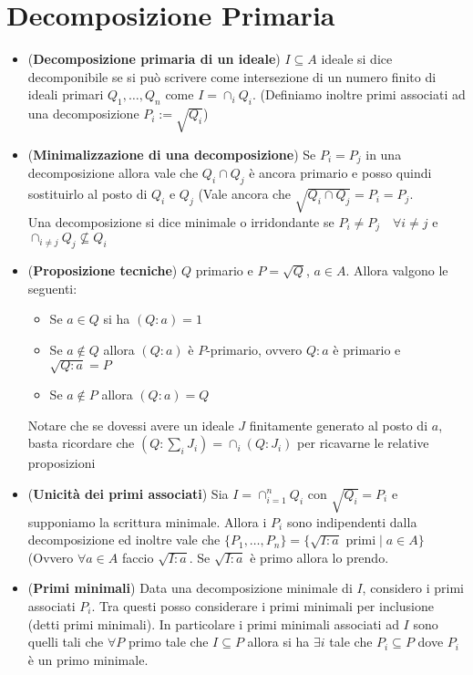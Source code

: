 \documentclass[a4paper,NoNotes,GeneralMath]{stdmdoc}
\begin{document}
	\section*{Decomposizione Primaria}
	\begin{itemize}
		\item ({\bf Decomposizione primaria di un ideale}) $I \subseteq A$ ideale si dice decomponibile se si può scrivere come intersezione di un numero finito di ideali primari $Q_1, \ldots, Q_n$ come $I = \cap_i Q_i$. (Definiamo inoltre primi associati ad una decomposizione $P_i := \sqrt{Q_i}$)
		\item ({\bf Minimalizzazione di una decomposizione}) Se $P_i = P_j$ in una decomposizione allora vale che $Q_i \cap Q_j$ è ancora primario e posso quindi sostituirlo al posto di $Q_i$ e $Q_j$ (Vale ancora che $\sqrt{Q_i \cap Q_j} = P_i = P_j$. \\
		Una decomposizione si dice minimale o irridondante se $P_i \neq P_j \quad \forall i \neq j$ e $\cap_{i\neq j} Q_j \not\subseteq Q_i$
		\item ({\bf Proposizione tecniche}) $Q$ primario e $P = \sqrt{Q}$, $a \in A$. Allora valgono le seguenti:
			\begin{itemize}
				\item Se $a \in Q$ si ha $(Q : a) = 1$
				\item Se $a \notin Q$ allora $(Q : a)$ è $P$-primario, ovvero $Q:a$ è primario e $\sqrt{Q:a} = P$
				\item Se $a \notin P$ allora $(Q : a) = Q$
			\end{itemize}
			Notare che se dovessi avere un ideale $J$ finitamente generato al posto di $a$, basta ricordare che $(Q : \sum_i J_i) = \cap_i (Q : J_i)$ per ricavarne le relative proposizioni
		\item ({\bf Unicità dei primi associati}) Sia $I = \cap_{i=1}^n Q_i$ con $\sqrt{Q_i} = P_i$ e supponiamo la scrittura minimale. Allora i $P_i$ sono indipendenti dalla decomposizione ed inoltre vale che $\{P_1, \ldots, P_n\} = \{ \sqrt{I:a} \text{ primi} \mid a \in A \}$ (Ovvero $\forall a \in A$ faccio $\sqrt{I:a}$. Se $\sqrt{I:a}$ è primo allora lo prendo.
		\item ({\bf Primi minimali}) Data una decomposizione minimale di $I$, considero i primi associati $P_i$. Tra questi posso considerare i primi minimali per inclusione (detti primi minimali). In particolare i primi minimali associati ad $I$ sono quelli tali che $\forall P$ primo tale che $I \subseteq P$ allora si ha $\exists i$ tale che $P_i \subseteq P$ dove $P_i$ è un primo minimale.

\end{itemize}
\end{document}
